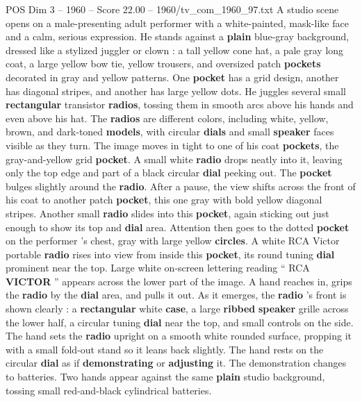 \begin{textsample}{POS Dim 3 – 1960 – Score 22.00 – 1960/tv\_com\_1960\_97.txt}  \label{ex:f3_pos_024}
A studio scene opens on a male-presenting adult performer with a white-painted, mask-like face and a calm, serious expression.
He stands against a \textbf{plain} blue-gray background, dressed like a stylized juggler or clown : a tall yellow cone hat, a pale gray long coat, a large yellow bow tie, yellow trousers, and oversized patch \textbf{pockets} decorated in gray and yellow patterns.
One \textbf{pocket} has a grid design, another has diagonal stripes, and another has large yellow dots.
He juggles several small \textbf{rectangular} transistor \textbf{radios}, tossing them in smooth arcs above his hands and even above his hat.
The \textbf{radios} are different colors, including white, yellow, brown, and dark-toned \textbf{models}, with circular \textbf{dials} and small \textbf{speaker} faces visible as they turn.
The image moves in tight to one of his coat \textbf{pockets}, the gray-and-yellow grid \textbf{pocket}.
A small white \textbf{radio} drops neatly into it, leaving only the top edge and part of a black circular \textbf{dial} peeking out.
The \textbf{pocket} bulges slightly around the \textbf{radio}.
After a pause, the view shifts across the front of his coat to another patch \textbf{pocket}, this one gray with bold yellow diagonal stripes.
Another small \textbf{radio} slides into this \textbf{pocket}, again sticking out just enough to show its top and \textbf{dial} area.
Attention then goes to the dotted \textbf{pocket} on the performer ’s chest, gray with large yellow \textbf{circles}.
A white RCA Victor portable \textbf{radio} rises into view from inside this \textbf{pocket}, its round tuning \textbf{dial} prominent near the top.
Large white on-screen lettering reading “ RCA \textbf{VICTOR} ” appears across the lower part of the image.
A hand reaches in, grips the \textbf{radio} by the \textbf{dial} area, and pulls it out.
As it emerges, the \textbf{radio} ’s front is shown clearly : a \textbf{rectangular} white \textbf{case}, a large \textbf{ribbed} \textbf{speaker} grille across the lower half, a circular tuning \textbf{dial} near the top, and small controls on the side.
The hand sets the \textbf{radio} upright on a smooth white rounded surface, propping it with a small fold-out stand so it leans back slightly.
The hand rests on the circular \textbf{dial} as if \textbf{demonstrating} or \textbf{adjusting} it.
The demonstration changes to batteries.
Two hands appear against the same \textbf{plain} studio background, tossing small red-and-black cylindrical batteries.

\end{textsample}
